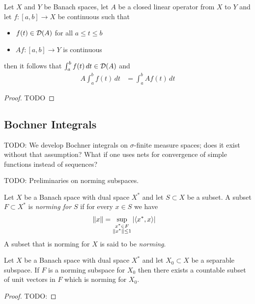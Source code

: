 \begin{prop}\label{ClosedOperatorOfRiemannIntegral}Let $X$ and $Y$ be
  Banach spaces, let $A$ be a closed linear operator from $X$ to $Y$ and
  let $f : [a,b] \to X$ be continuous such that
\begin{itemize}
\item[(i)] $f(t) \in \mathcal{D}(A)$ for all $a \leq t \leq b$
\item[(ii)] $Af : [a,b] \to Y$ is continuous
\end{itemize}
then it follows that $\int_a^b f(t) \, dt \in \mathcal{D}(A)$ and
\begin{align*}
A \int_a^b f(t) \, dt &= \int_a^b A f(t) \, dt
\end{align*}
\end{prop}
\begin{proof}

TODO
\end{proof}

\subsection{Bochner Integrals}

TODO: We develop Bochner integrals on $\sigma$-finite measure spaces;
does it exist without that assumption?  What if one uses nets for
convergence of simple functions instead of sequences?

TODO: Preliminaries on norming subspaces.
\begin{defn}Let $X$ be a Banach space with dual space $X^*$ and let $S \subset X$ be a subset.  A subset $F \subset X^*$ is
  \emph{norming for $S$} if for every $x \in S$ we have
  \begin{align*}
    \left \lVert x \right \rVert &= \sup_{\substack{
                        x^* \in F \\
                        \left \lVert x^* \right \rVert \leq 1}} \left \vert  \langle x^*, x \rangle \right \vert
  \end{align*}
A subset that is norming for $X$ is said to be \emph{norming}.  
\end{defn}

\begin{prop}Let $X$ be a Banach space with dual space $X^*$ and let $X_0 \subset X$ be a separable subspace.   If $F$ is a
  norming subspace for $X_0$ then there exists a countable subset of unit vectors in $F$ which is norming for $X_0$.
\end{prop}
\begin{proof}
  TODO:
\end{proof}

